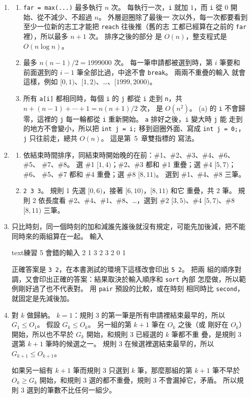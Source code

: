 \begin{enumerate}
\item
\begin{enumerate}
\item \texttt{far = max(...)} 最多執行 $n$ 次。 每執行一次，\texttt{i} 就加
$1$，而 \texttt{i} 從 $0$ 開始、從不減少、不超過 $n$。 外層迴圈除了最後一
次以外，每一次都要看到至少一位新的志工才能把 \texttt{reach} 往後推（舊的志
工都已經算在之前的 \texttt{far} 裡），所以最多 $n + 1$ 次。 排序之後的部分
是 $O(n)$，整支程式是 $O(n \log n)$。
\item 最多 $n(n - 1)/2 = 1999000$ 次。 每一筆申請都被選到時，第 $i$ 筆要和
前面選到的 $i - 1$ 筆全部比過，中途不會 \texttt{break}。 兩兩不重疊的輸入
就會這樣，例如 $[0, 1)$、$[1, 2)$、\ldots、$[1999, 2000)$。
\item 所有 \texttt{a[i]} 都相同時，每個 \texttt{i} 的 \texttt{j} 都從
\texttt{i} 走到 \texttt{n}，共 $n + (n - 1) + \cdots + 1 = n(n + 1)/2$ 次，
是 $O(n^2)$。 (a) 的 \texttt{i} 不會歸零，這裡的 \texttt{j} 每一輪都從
\texttt{i} 重新開始。 \texttt{a} 排好之後，\texttt{i} 變大時 \texttt{j} 能
走到的地方不會變小，所以把 \texttt{int j = i;} 移到迴圈外面、寫成
\texttt{int j = 0;}，\texttt{j} 只往前走，總共 $O(n)$。 這是第~5~章雙指標的
寫法。
\end{enumerate}

\item
\begin{enumerate}
\item 依結束時間排序，同結束時開始晚的在前：\#1、\#2、\#3、\#4、\#6、\#5、
\#7、\#8。 選 \#1 $[1, 4)$；\#2、\#3 都和 \#1 重疊；選 \#4 $[5, 7)$；\#6、
\#5、\#7 都和 \#4 重疊；選 \#8 $[8, 11)$。 選到 \#1、\#4、\#8 三筆。
\item \texttt{2 3 3}。 規則 1 先選 $[0, 6)$，接著 $[6, 10)$，$[8, 11)$ 和它
重疊，共 $2$ 筆。 規則 2 依長度看 \#2、\#4、\#1、\#8、\ldots，選到 \#2
$[3, 5)$、\#4 $[5, 7)$、\#8 $[8, 11)$ 三筆。
\end{enumerate}

\item 只比時刻，同一個時刻的加和減誰先誰後就沒有規定，可能先加後減，把不能
同時來的兩組算在一起。 輸入
\begin{code}{text}{練習 5 會錯的輸入}
2 1
3 2 3
2 0 1
\end{code}
正確答案是 \texttt{3 2}，在本書測試的環境下這樣改會印出 \texttt{5 2}。 把兩
組的順序對調，又會印出正確的答案：結果取決於輸入順序和 \texttt{sort} 內部
怎麼做，所以範例剛好過了也不代表對。 用 \texttt{pair} 預設的比較，或在時刻
相同時比 \texttt{second}，就固定是先減後加。

\item 對 $k$ 做歸納。 $k = 1$：規則 3 的第一筆是所有申請裡結束最早的，所以
$G_1 \le O_1$。 假設 $G_k \le O_k$。 另一組的第 $k + 1$ 筆在 $O_k$ 之後（或
剛好在 $O_k$）開始，所以也不早於 $G_k$ 開始，和規則 3 已經選的 $k$ 筆都不重
疊，是規則 3 選第 $k + 1$ 筆時的候選之一。 規則 3 在候選裡選結束最早的，所以
$G_{k+1} \le O_{k+1}$。

如果另一組有 $k + 1$ 筆而規則 3 只選到 $k$ 筆，那麼那組的第 $k + 1$ 筆不早於
$O_k \ge G_k$ 開始，和規則 3 選的都不重疊，規則 3 不會漏掉它，矛盾。 所以規
則 3 選到的筆數不比任何一組少。
\end{enumerate}
